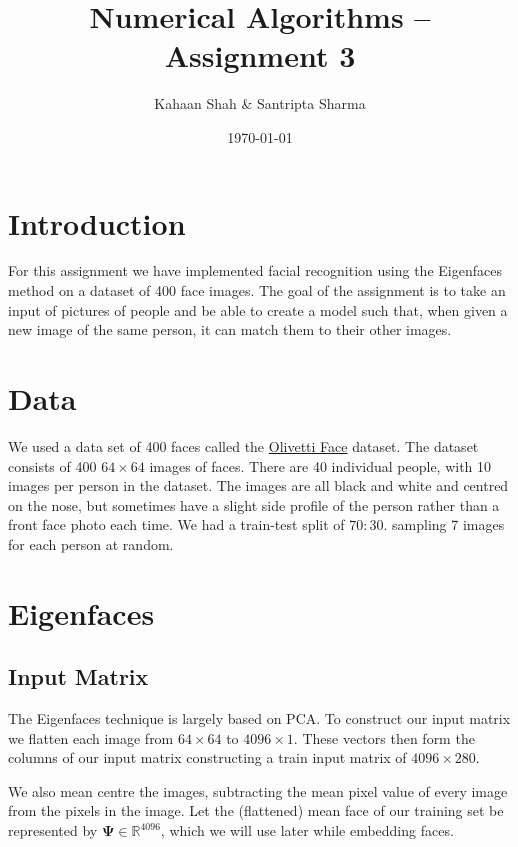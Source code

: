 \documentclass[article]{article}
\title{Numerical Algorithms – Assignment 3}
\author{Kahaan Shah \& Santripta Sharma}
\date{\today}
\begin{document}
\maketitle

\section{Introduction}
For this assignment we have implemented facial recognition using the Eigenfaces method on a dataset of 400 face images. The goal of the assignment is to take an input of pictures of people and be able to  create a model such that, when given a new image of the same person, it can match them to their other images.

\section{Data}
We used a data set of 400 faces called the \href{https://paperswithcode.com/dataset/olivetti-face}{Olivetti Face} dataset. The dataset consists of 400 $64 \times 64$ images of faces. There are 40 individual people, with 10 images per person in the dataset. The images are all black and white and centred on the nose, but sometimes have a slight side profile of the person rather than a front face photo each time. We had a train-test split of $70:30$. sampling 7 images for each person at random.

\section{Eigenfaces}

\subsection{Input Matrix}

The Eigenfaces technique is largely based on PCA. To construct our input matrix we flatten each image from $64 \times 64$ to $4096 \times 1$. These vectors then form the columns of our input matrix constructing a train input matrix of $4096 \times 280$. \bigskip

We also mean centre the images, subtracting the mean pixel value of every image from the pixels in the image. Let the (flattened) mean face of our training set be represented by $\mathbf{\Psi} \in \mathbb{R}^{4096}$, which we will use later while embedding faces.
\end{document}
